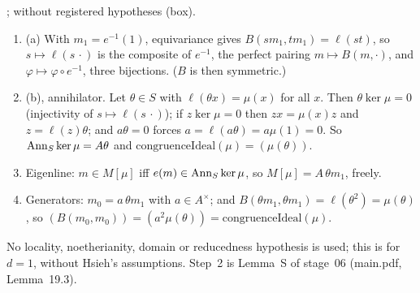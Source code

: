 \begin{outline}
\stproved; \stformal{} without registered hypotheses (box).
\begin{enumerate}[label=\arabic*.]
\item (a) With $m_1=e^{-1}(1)$, equivariance gives $B(sm_1,tm_1)=\ell(st)$, so $s\mapsto\ell(s\,\cdot)$ is the composite of
  $e^{-1}$, the perfect pairing $m\mapsto B(m,\cdot)$, and $\varphi\mapsto\varphi\circ e^{-1}$, three bijections. ($B$ is
  then symmetric.)
\item (b), annihilator. Let $\theta\in S$ with $\ell(\theta x)=\mu(x)$ for all $x$. Then $\theta\ker\mu=0$ (injectivity of
  $s\mapsto\ell(s\,\cdot)$); if $z\ker\mu=0$ then $zx=\mu(x)z$ and $z=\ell(z)\theta$; and $a\theta=0$ forces
  $a=\ell(a\theta)=a\mu(1)=0$. So $\operatorname{Ann}_S\ker\mu=A\theta$ and $\mathrm{congruenceIdeal}(\mu)=(\mu(\theta))$.
\item Eigenline: $m\in M[\mu]$ iff $e(m)\in\operatorname{Ann}_S\ker\mu$, so $M[\mu]=A\,\theta m_1$, freely.
\item Generators: $m_0=a\,\theta m_1$ with $a\in A^\times$; and $B(\theta m_1,\theta m_1)=\ell(\theta^2)=\mu(\theta)$, so
  $(B(m_0,m_0))=(a^2\mu(\theta))=\mathrm{congruenceIdeal}(\mu)$.
\end{enumerate}
No locality, noetherianity, domain or reducedness hypothesis is used; this is \cite[Rem.~7.3, p.~67]{Hs} for $d=1$, without
Hsieh's assumptions. Step~2 is Lemma~S of stage~06 (main.pdf, Lemma~19.3).
\end{outline}

